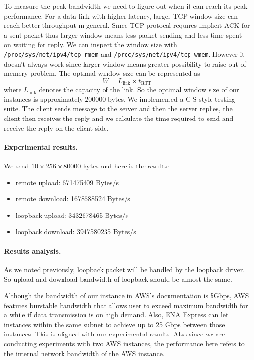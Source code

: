 To measure the peak bandwidth we need to figure out when it can reach its peak performance. For a data link with higher latency, larger TCP window size can reach better throughput in general. Since TCP protocal requires implicit ACK for a sent packet thus larger window means less packet sending and less time spent on waiting for reply. We can inspect the window size with \texttt{/proc/sys/net/ipv4/tcp\_rmem} and \texttt{/proc/sys/net/ipv4/tcp\_wmem}. However it doesn't always work since larger window means greater possibility to raise out-of-memory problem. The optimal window size can be represented as
\begin{equation}
W=L_{\text{link}} \times t_{\text{RTT}}
\end{equation}
where $L_{\text{link}}$ denotes the capacity of the link. So the optimal window size of our instances is approximately $200000$ bytes. We implemented a C-S style testing suite. The client sends message to the server and then the server replies, the client then receives the reply and we calculate the time required to send and receive the reply on the client side.

\paragraph{Experimental results.}
We send $10 \times 256 \times 80000$ bytes and here is the results:
\begin{itemize}[leftmargin=*]
	\item remote upload:    671475409 Bytes/s
	\item remote download: 1678688524 Bytes/s
\end{itemize}
\begin{itemize}[leftmargin=*]
	\item loopback upload:   3432678465 Bytes/s
	\item loopback download: 3947580235 Bytes/s
\end{itemize}
\paragraph{Results analysis.} As we noted previously, loopback packet will be handled by the loopback driver. So upload and download bandwidth of loopback should be almost the same. 

Although the bandwidth of our instance in AWS's documentation is 5Gbps, AWS features burstable bandwidth that allows user to exceed maximum bandwidth for a while if data transmission is on high demand. Also, ENA Express can let instances within the same subnet to achieve up to 25 Gbps between those instances\cite{amazonec2}. This is aligned with our experimental results. Also since we are conducting experiments with two AWS instances, the performance here refers to the internal network bandwidth of the AWS instance.

